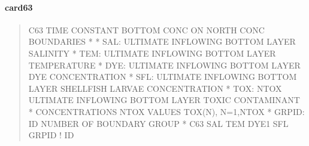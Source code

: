 \documentclass[letterpaper,10pt,english]{sphinxmanual}
\begin{document}
\paragraph{card63}
\label{\detokenize{inputfiles/runcontrol/card63:card63}}\label{\detokenize{inputfiles/runcontrol/card63::doc}}\begin{quote}

\begin{sphinxVerbatim}[commandchars=\\\{\}]
\PYGZhy{}\PYGZhy{}\PYGZhy{}\PYGZhy{}\PYGZhy{}\PYGZhy{}\PYGZhy{}\PYGZhy{}\PYGZhy{}\PYGZhy{}\PYGZhy{}\PYGZhy{}\PYGZhy{}\PYGZhy{}\PYGZhy{}\PYGZhy{}\PYGZhy{}\PYGZhy{}\PYGZhy{}\PYGZhy{}\PYGZhy{}\PYGZhy{}\PYGZhy{}\PYGZhy{}\PYGZhy{}\PYGZhy{}\PYGZhy{}\PYGZhy{}\PYGZhy{}\PYGZhy{}\PYGZhy{}\PYGZhy{}\PYGZhy{}\PYGZhy{}\PYGZhy{}\PYGZhy{}\PYGZhy{}\PYGZhy{}\PYGZhy{}\PYGZhy{}\PYGZhy{}\PYGZhy{}\PYGZhy{}\PYGZhy{}\PYGZhy{}\PYGZhy{}\PYGZhy{}\PYGZhy{}\PYGZhy{}\PYGZhy{}\PYGZhy{}\PYGZhy{}\PYGZhy{}\PYGZhy{}\PYGZhy{}\PYGZhy{}\PYGZhy{}\PYGZhy{}\PYGZhy{}\PYGZhy{}\PYGZhy{}\PYGZhy{}\PYGZhy{}\PYGZhy{}\PYGZhy{}\PYGZhy{}\PYGZhy{}\PYGZhy{}\PYGZhy{}\PYGZhy{}\PYGZhy{}\PYGZhy{}\PYGZhy{}\PYGZhy{}\PYGZhy{}\PYGZhy{}\PYGZhy{}\PYGZhy{}
C63 TIME CONSTANT BOTTOM CONC ON NORTH CONC BOUNDARIES
*
*    SAL: ULTIMATE INFLOWING BOTTOM LAYER SALINITY
*    TEM: ULTIMATE INFLOWING BOTTOM LAYER TEMPERATURE
*    DYE: ULTIMATE INFLOWING BOTTOM LAYER DYE CONCENTRATION
*    SFL: ULTIMATE INFLOWING BOTTOM LAYER SHELLFISH LARVAE CONCENTRATION
*    TOX: NTOX ULTIMATE INFLOWING BOTTOM LAYER TOXIC CONTAMINANT
*         CONCENTRATIONS NTOX VALUES TOX(N), N=1,NTOX
*  GRPID: ID NUMBER OF BOUNDARY GROUP
*
C63       SAL       TEM      DYE1       SFL      GRPID ! ID
\end{sphinxVerbatim}
\end{quote}
\end{document}
